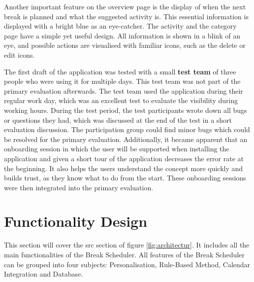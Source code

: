 \documentclass{hasel_thesis}
\begin{document}
Another important feature on the overview page is the display of when the next break is planned and what the suggested activity is. This essential information is displayed with a bright blue as an eye-catcher. The activity and the category page have a simple yet useful design. All information is shown in a blink of an eye, and possible actions are visualised with familiar icons, such as the delete or edit icons. 

The first draft of the application was tested with a small \textbf{test team} of three people who were using it for multiple days. This test team was not part of the primary evaluation afterwards. The test team used the application during their regular work day, which was an excellent test to evaluate the visibility during working hours. During the test period, the test participants wrote down all bugs or questions they had, which was discussed at the end of the test in a short evaluation discussion. The participation group could find minor bugs which could be resolved for the primary evaluation. Additionally, it became apparent that an onboarding session in which the user will be supported when installing the application and given a short tour of the application decreases the error rate at the beginning. It also helps the users understand the concept more quickly and builds trust, as they know what to do from the start. These onboarding sessions were then integrated into the primary evaluation.


\section{Functionality Design}

This section will cover the src section of figure \ref{fig:architectur}. It includes all the main functionalities of the Break Scheduler. All features of the Break Scheduler can be grouped into four subjects: Personalisation, Rule-Based Method, Calendar Integration and Database.
\end{document}
